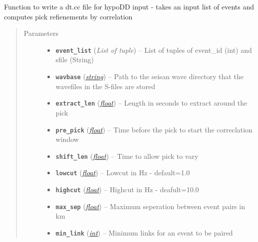 \documentclass[a4paper,10pt,english]{sphinxmanual}
\begin{document}
\begin{fulllineitems}
\label{utils:catalogue2DD.write_correlations}
Function to write a dt.cc file for hypoDD input - takes an input list of
events and computes pick refienements by correlation
\begin{quote}\begin{description}
\item[{Parameters}] \leavevmode\begin{itemize}
\item {} 
\textbf{\texttt{event\_list}} (\emph{List of tuple}) -- List of tuples of event\_id (int) and sfile (String)

\item {} 
\textbf{\texttt{wavbase}} (\href{https://docs.python.org/library/string.html\#module-string}{\emph{string}}) -- Path to the seisan wave directory that the wavefiles in the
S-files are stored

\item {} 
\textbf{\texttt{extract\_len}} (\href{https://docs.python.org/library/functions.html\#float}{\emph{float}}) -- Length in seconds to extract around the pick

\item {} 
\textbf{\texttt{pre\_pick}} (\href{https://docs.python.org/library/functions.html\#float}{\emph{float}}) -- Time before the pick to start the correclation window

\item {} 
\textbf{\texttt{shift\_len}} (\href{https://docs.python.org/library/functions.html\#float}{\emph{float}}) -- Time to allow pick to vary

\item {} 
\textbf{\texttt{lowcut}} (\href{https://docs.python.org/library/functions.html\#float}{\emph{float}}) -- Lowcut in Hz - default=1.0

\item {} 
\textbf{\texttt{highcut}} (\href{https://docs.python.org/library/functions.html\#float}{\emph{float}}) -- Highcut in Hz - deafult=10.0

\item {} 
\textbf{\texttt{max\_sep}} (\href{https://docs.python.org/library/functions.html\#float}{\emph{float}}) -- Maximum seperation between event pairs in km

\item {} 
\textbf{\texttt{min\_link}} (\href{https://docs.python.org/library/functions.html\#int}{\emph{int}}) -- Minimum links for an event to be paired

\end{itemize}

\end{description}\end{quote}

\end{fulllineitems}
\end{document}
